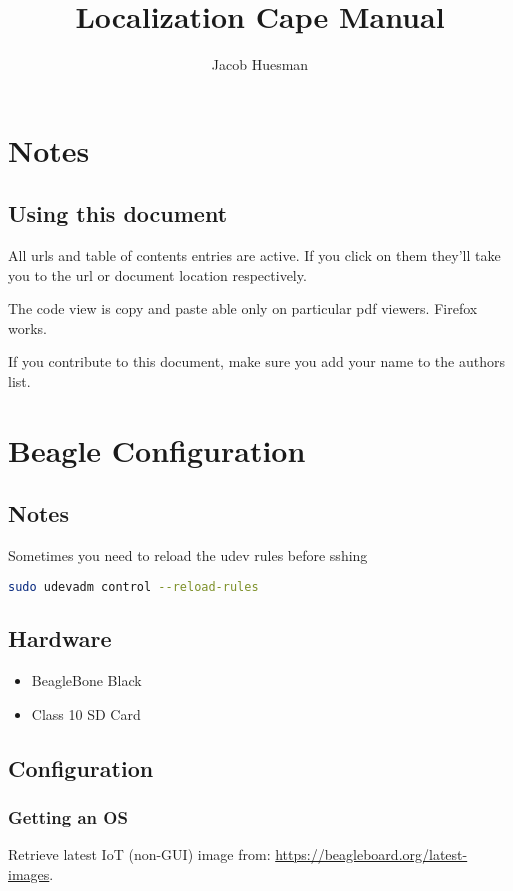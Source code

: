 \documentclass[]{book}
\title{Localization Cape Manual}
\author{Jacob Huesman}
\begin{document}
\let\cleardoublepage\clearpage
\maketitle
\tableofcontents

\chapter{Notes}
\section{Using this document}
All urls and table of contents entries are active. If you click on them they'll take you to the url or document location respectively.

The code view is copy and paste able only on particular pdf viewers. Firefox works.

If you contribute to this document, make sure you add your name to the authors list.

\chapter{Beagle Configuration}
\section{Notes}
Sometimes you need to reload the udev rules before sshing
\begin{lstlisting}[language=bash]
sudo udevadm control --reload-rules
\end{lstlisting}

\section{Hardware}
\begin{itemize}
	\item BeagleBone Black
	\item Class 10 SD Card
\end{itemize}

\section{Configuration}
\subsection{Getting an OS}
Retrieve latest IoT (non-GUI) image from: \url{https://beagleboard.org/latest-images}.
\end{document}
